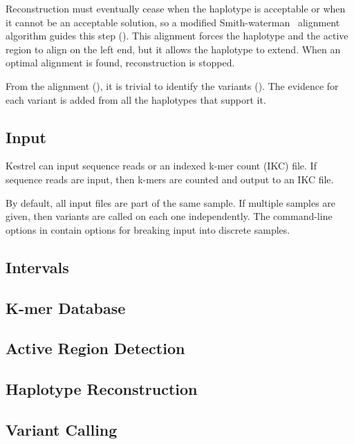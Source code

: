 Reconstruction must eventually cease when the haplotype is acceptable or when it cannot be an acceptable solution, so a modified Smith-waterman~\cite{Smith1981} alignment algorithm guides this step (). This alignment forces the haplotype and the active region to align on the left end, but it allows the haplotype to extend. When an optimal alignment is found, reconstruction is stopped.

From the alignment (), it is trivial to identify the variants (). The evidence for each variant is added from all the haplotypes that support it.


\subsection{Input}
\label{sec.process.input}

Kestrel can input sequence reads or an indexed k-mer count (IKC) file. If sequence reads are input, then k-mers are counted and output to an IKC file.

By default, all input files are part of the same sample. If multiple samples are given, then variants are called on each one independently. The command-line options in  contain options for breaking input into discrete samples.



\subsection{Intervals}
\label{sec.process.intervals}


\subsection{K-mer Database}
\label{sec.process.kdb}


\subsection{Active Region Detection}
\label{sec.process.ardetect}


\subsection{Haplotype Reconstruction}
\label{sec.process.haplo}


\subsection{Variant Calling}
\label{sec.process.varcall}

